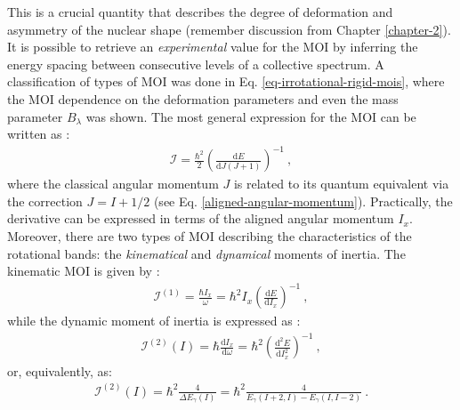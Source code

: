 This is a crucial quantity that describes the degree of deformation and asymmetry of the nuclear shape (remember discussion from Chapter \ref{chapter-2}). It is possible to retrieve an \emph{experimental} value for the MOI by inferring the energy spacing between consecutive levels of a collective spectrum. A classification of types of MOI was done in Eq. \ref{eq-irrotational-rigid-mois}, where the MOI dependence on the deformation parameters and even the mass parameter $B_\lambda$ was shown. The most general expression for the MOI can be written as \cite{ahmad2021backbending}:
\begin{align}
    \mathcal{I}=\frac{\hbar^2}{2}\left(\frac{\text{d}E}{\text{d}J(J+1)}\right)^{-1}\ ,
\end{align}
where the classical angular momentum $J$ is related to its quantum equivalent via the correction $J=I+1/2$ (see Eq. \ref{aligned-angular-momentum}). Practically, the derivative can be expressed in terms of the aligned angular momentum $I_x$. Moreover, there are two types of MOI describing the characteristics of the rotational bands: the \emph{kinematical} and \emph{dynamical} moments of inertia. The kinematic MOI is given by \cite{wu1992relation}:
\begin{align}
    \mathcal{I}^{(1)}=\frac{\hbar I_x}{\omega}=\hbar^2 I_x\left(\frac{\text{d}E}{\text{d}I_x}\right)^{-1}\ ,
    \label{kinematic-moi-general}
\end{align}
while the dynamic moment of inertia is expressed as \cite{wu1992relation}:
\begin{align}
    \mathcal{I}^{(2)}(I)=\hbar\frac{\text{d}I_x}{\text{d}\omega}=\hbar^2\left(\frac{\text{d}^2E}{\text{d}I_x^2}\right)^{-1}\ ,
    \label{dynamic-moi-general}
\end{align}
or, equivalently, as:
\begin{align}
    \mathcal{I}^{(2)}(I)=\hbar^2\frac{4}{\Delta E_\gamma(I)}=\hbar^2\frac{4}{E_\gamma(I+2,I)-E_\gamma(I,I-2)}\ .
    \label{dynamic-moi-energy-levels}
\end{align}


